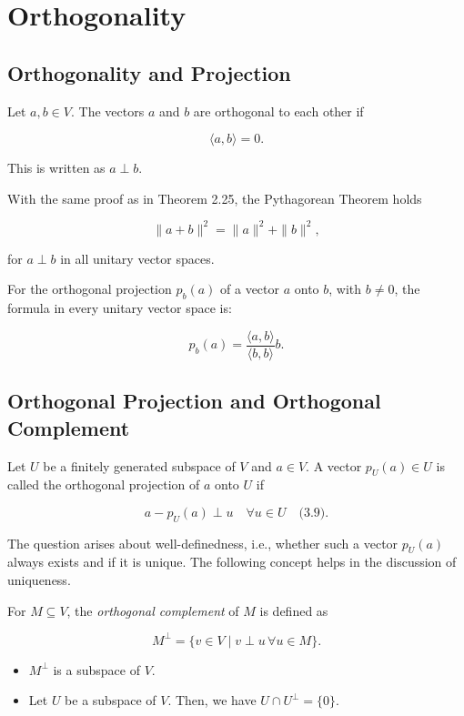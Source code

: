 \newpage
\section{Orthogonality}

\subsection{Orthogonality and Projection}

Let \( a, b \in V \). The vectors \( a \) and \( b \) are orthogonal to each other if

\[
\langle a, b \rangle = 0.
\]

This is written as \( a \perp b \).
\vspace{\baselineskip}

With the same proof as in Theorem 2.25, the Pythagorean Theorem holds

\[
\|a + b\|^2 = \|a\|^2 + \|b\|^2,
\]

for \( a \perp b \) in all unitary vector spaces.
\vspace{\baselineskip}

For the orthogonal projection \( p_b(a) \) of a vector \( a \) onto \( b \), with \( b \neq 0 \), the formula in every unitary vector space is:

\[
p_b(a) = \frac{\langle a, b \rangle}{\langle b, b \rangle} b.
\]

\subsection{Orthogonal Projection and Orthogonal Complement}

Let \( U \) be a finitely generated subspace of \( V \) and \( a \in V \). A vector \( p_U(a) \in U \) is called the orthogonal projection of \( a \) onto \( U \) if

\[
a - p_U(a) \perp u \quad \forall u \in U \quad \text{(3.9)}.
\]

The question arises about well-definedness, i.e., whether such a vector \( p_U(a) \) always exists and if it is unique. The following concept helps in the discussion of uniqueness.
\vspace{\baselineskip}

For \( M \subseteq V \), the \emph{orthogonal complement} of \( M \) is defined as

\[
M^\perp = \{ v \in V \mid v \perp u \, \forall u \in M \}.
\]

\begin{itemize}[label=\(-\)]
    \item \( M^\perp \) is a subspace of \( V \).
    \item Let \( U \) be a subspace of \( V \). Then, we have \( U \cap U^\perp = \{0\} \).
\end{itemize}

